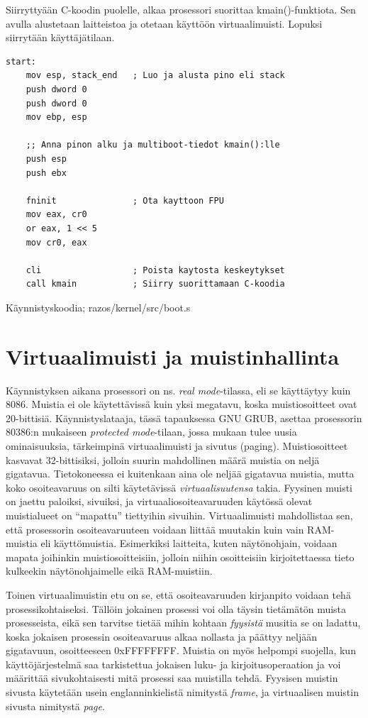 Siirryttyään C-koodin puolelle, alkaa prosessori suorittaa kmain()-funktiota. Sen avulla alustetaan laitteistoa ja otetaan käyttöön virtuaalimuisti. Lopuksi siirrytään käyttäjätilaan.

\begin{listing}[H]
\begin{verbatim}
start:
    mov esp, stack_end   ; Luo ja alusta pino eli stack
    push dword 0
    push dword 0
    mov ebp, esp

    ;; Anna pinon alku ja multiboot-tiedot kmain():lle
    push esp
    push ebx

    fninit               ; Ota kayttoon FPU
    mov eax, cr0
    or eax, 1 << 5
    mov cr0, eax

    cli                  ; Poista kaytosta keskeytykset
    call kmain           ; Siirry suorittamaan C-koodia
\end{verbatim}
\caption{Käynnistyskoodia; razos/kernel/src/boot.s}
\label{lst:boot}
\end{listing}

\section{Virtuaalimuisti ja muistinhallinta}
Käynnistyksen aikana prosessori on ns. \textit{real mode}-tilassa, eli se käyttäytyy kuin 8086. Muistia ei ole käytettävissä kuin yksi megatavu, koska muistiosoitteet ovat 20-bittisiä. Käynnistyslataaja, tässä tapauksessa GNU GRUB, asettaa prosessorin 80386:n mukaiseen \textit{protected mode}-tilaan, jossa mukaan tulee uusia ominaisuuksia, tärkeimpinä virtuaalimuisti ja sivutus (paging). Muistiosoitteet kasvavat 32-bittisiksi, jolloin suurin mahdollinen määrä muistia on neljä gigatavua. Tietokoneessa ei kuitenkaan aina ole neljää gigatavua muistia, mutta koko osoiteavaruus on silti käytetävissä \textit{virtuaalisuutensa} takia. Fyysinen muisti on jaettu paloiksi, sivuiksi, ja virtuaaliosoiteavaruuden käytössä olevat muistialueet on ``mapattu'' tiettyihin sivuihin. Virtuaalimuisti mahdollistaa sen, että prosessorin osoiteavaruuteen voidaan liittää muutakin kuin vain RAM-muistia eli käyttömuistia. Esimerkiksi laitteita, kuten näytönohjain, voidaan mapata joihinkin muistiosoitteisiin, jolloin niihin osoitteisiin kirjoitettaessa tieto kulkeekin näytönohjaimelle eikä RAM-muistiin.

\par

Toinen virtuaalimuistin etu on se, että osoiteavaruuden kirjanpito voidaan tehä prosessikohtaiseksi. Tällöin jokainen prosessi voi olla täysin tietämätön muista prosesseista, eikä sen tarvitse tietää mihin kohtaan \textit{fyysistä} musitia se on ladattu, koska jokaisen prosessin osoiteavaruus alkaa nollasta ja päättyy neljään gigatavuun, osoitteeseen 0xFFFFFFFF. Muistia on myös helpompi suojella, kun käyttöjärjestelmä saa tarkistettua jokaisen luku- ja kirjoitusoperaation ja voi määrittää sivukohtaisesti mitä prosessi saa muistilla tehdä. Fyysisen muistin sivusta käytetään usein englanninkielistä nimitystä \textit{frame}, ja virtuaalisen muistin sivusta nimitystä \textit{page}.

